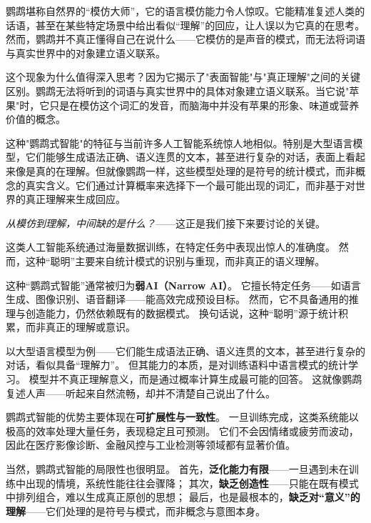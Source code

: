 鹦鹉堪称自然界的“模仿大师”，它的语言模仿能力令人惊叹。它能精准复述人类的话语，甚至在某些特定场景中给出看似“理解”的回应，让人误以为它真的在思考。  
然而，鹦鹉并不真正懂得自己在说什么——它模仿的是声音的模式，而无法将词语与真实世界中的对象建立语义联系。  
  

这个现象为什么值得深入思考？因为它揭示了"表面智能"与"真正理解"之间的关键区别。鹦鹉无法将听到的词语与真实世界中的具体对象建立语义联系。当它说"苹果"时，它只是在模仿这个词汇的发音，而脑海中并没有苹果的形象、味道或营养价值的概念。

这种"鹦鹉式智能"的特征与当前许多人工智能系统惊人地相似。特别是大型语言模型，它们能够生成语法正确、语义连贯的文本，甚至进行复杂的对话，表面上看起来像是真的在理解。但就像鹦鹉一样，这些模型处理的是符号的统计模式，而非概念的真实含义。它们通过计算概率来选择下一个最可能出现的词汇，而非基于对世界的真正理解来生成回应。

\emph{从模仿到理解，中间缺的是什么？}——这正是我们接下来要讨论的关键。

这类人工智能系统通过海量数据训练，在特定任务中表现出惊人的准确度。  
然而，这种“聪明”主要来自统计模式的识别与重现，而非真正的语义理解。  
  
这种“鹦鹉式智能”通常被归为\textbf{弱AI（Narrow AI）}。  
它擅长特定任务——如语言生成、图像识别、语音翻译——能高效完成预设目标。  
然而，它不具备通用的推理与创造能力，仍然依赖既有的数据模式。  
换句话说，这种“聪明”源于统计积累，而非真正的理解或意识。  

以大型语言模型为例——它们能生成语法正确、语义连贯的文本，甚至进行复杂的对话，看似具备“理解力”。  
但其能力的本质，是对训练语料中语言模式的统计学习。  
模型并不真正理解意义，而是通过概率计算生成最可能的回答。  
这就像鹦鹉复述人声——听起来自然流畅，却并不清楚自己说出了什么。  

鹦鹉式智能的优势主要体现在\textbf{可扩展性与一致性}。  
一旦训练完成，这类系统能以极高的效率处理大量任务，表现稳定且可预测。  
它们不会因情绪或疲劳而波动，因此在医疗影像诊断、金融风控与工业检测等领域都有显著价值。  

当然，鹦鹉式智能的局限性也很明显。  
首先，\textbf{泛化能力有限}——一旦遇到未在训练中出现的情境，系统性能往往会骤降；  
其次，\textbf{缺乏创造性}——只能在既有模式中排列组合，难以生成真正原创的思想；  
最后，也是最根本的，\textbf{缺乏对“意义”的理解}——它们处理的是符号与模式，而非概念与意图本身。  

